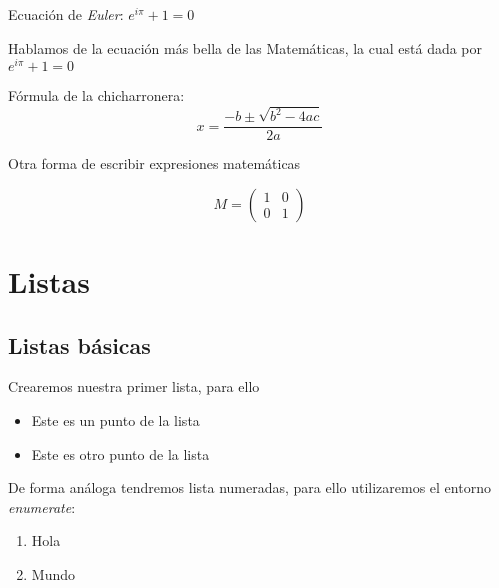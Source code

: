 \documentclass[12pt]{article}
\begin{document}
Ecuación de \textit{Euler}:
$e^{i \pi} + 1 = 0$

Hablamos de la ecuación más bella de las Matemáticas, la cual está dada por $e^{i \pi} + 1 = 0$
\vspace{0.5cm}

Fórmula de la chicharronera:
$$
x = \frac{-b\pm \sqrt{b^{2}-4ac}}{2a}
$$

Otra forma de escribir expresiones matemáticas


\begin{equation}
    M= \left(\begin{array}{cc}
        1 & 0 \\
        0 & 1 
    \end{array}\right)
\end{equation}

\newpage
\section{Listas}

\subsection{Listas básicas}

Crearemos nuestra primer lista, para ello

\begin{itemize}
    \item Este es un punto de la lista
    \item Este es otro punto de la lista
\end{itemize}

De forma análoga tendremos lista numeradas, para ello utilizaremos el entorno
\textit{enumerate}:
\begin{enumerate}
    \item Hola
    \item Mundo
\end{enumerate}
\end{document}
